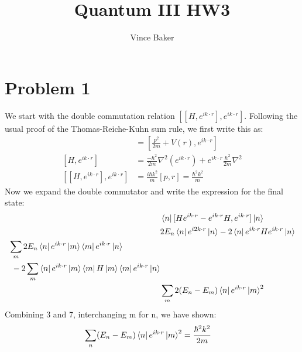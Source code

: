 \documentclass[a4paper,11pt]{article}
\title{Quantum III HW3}
\author{Vince Baker}
\numberwithin{equation}{section}
\begin{document}
\maketitle

\section{Problem 1}
We start with the double commutation relation $[[H,e^{ik\cdot r}],e^{ik\cdot r}]$. 
Following the usual proof of the Thomas-Reiche-Kuhn sum rule, we first write this as:
\begin{align}
 [H,e^{ik\cdot r}] &=  [\frac{p^2}{2m}+V(r),e^{ik\cdot r}]\\
 [H,e^{ik\cdot r}] &= \frac{-\hbar^2}{2m}\nabla^2(e^{ik\cdot r})+e^{ik\cdot r}\frac{\hbar^2}{2m}\nabla^2\\
 [[H,e^{ik\cdot r}],e^{ik\cdot r}] &= \frac{i\hbar k^2}{m}[p, r] = \frac{\hbar^2k^2}{m}
\end{align}
Now we expand the double commutator and write the expression for the final state:
\begin{align}
 &\bra{n}[He^{ik\cdot r}-e^{ik\cdot r}H,e^{ik\cdot r}]\ket{n}\\
 &2E_n\bra{n}e^{i2k\cdot r}\ket{n}-2\bra{n}e^{ik\cdot r}He^{ik\cdot r} \ket{n}\\
 \begin{split}
 &\sum_m 2E_n\bra{n}e^{ik\cdot r}\ket{m}\bra{m}e^{ik\cdot r}\ket{n}\\&\ -2\sum_m\bra{n}e^{ik\cdot r}\ket{m}\bra{m}H\ket{m}\bra{m}e^{ik\cdot r}\ket{n}
 \end{split}\\
 &\sum_m 2(E_n-E_m)\bra{n}e^{ik\cdot r}\ket{m}^2
\end{align}
Combining 3 and 7, interchanging m for n, we have shown:
\begin{align}
 \sum_n (E_n-E_m)\bra{n}e^{ik\cdot r}\ket{m}^2 &= \frac{\hbar^2k^2}{2m}
\end{align}
\end{document}
